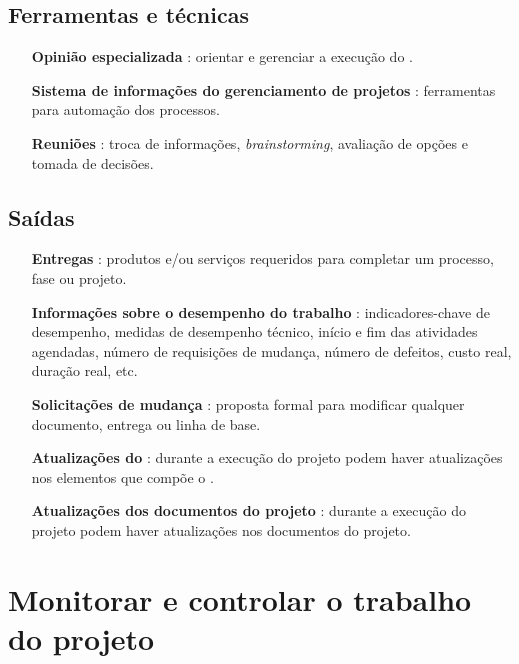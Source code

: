\section{Ferramentas e técnicas}

\begin{itemize}
	
	\item[\textbf{Opinião especializada}]: orientar e gerenciar a execução do \planproj.
	
	\item[\textbf{Sistema de informações do gerenciamento de projetos}]: ferramentas para automação dos processos.
	
	\item[\textbf{Reuniões}]: troca de informações, \textit{brainstorming}, avaliação de opções e tomada de decisões.
	
\end{itemize}

\section{Saídas}

\begin{itemize}

	\item[\textbf{Entregas}] : produtos e/ou serviços requeridos para completar um processo, fase ou projeto.
	
	\item[\textbf{Informações sobre o desempenho do trabalho}] : indicadores-chave de desempenho, medidas de desempenho técnico, início e fim das atividades agendadas, número de requisições de mudança, número de defeitos, custo real, duração real, etc.
	
	\item[\textbf{Solicitações de mudança}] : proposta formal para modificar qualquer documento, entrega ou linha de base.

	\item[\textbf{Atualizações do \planproj}] :	durante a execução do projeto podem haver atualizações nos elementos que compõe o \planproj.

	\item[\textbf{Atualizações dos documentos do projeto}] : durante a execução do projeto podem haver atualizações nos documentos do projeto.

\end{itemize}

\chapter{Monitorar e controlar o trabalho do projeto}

